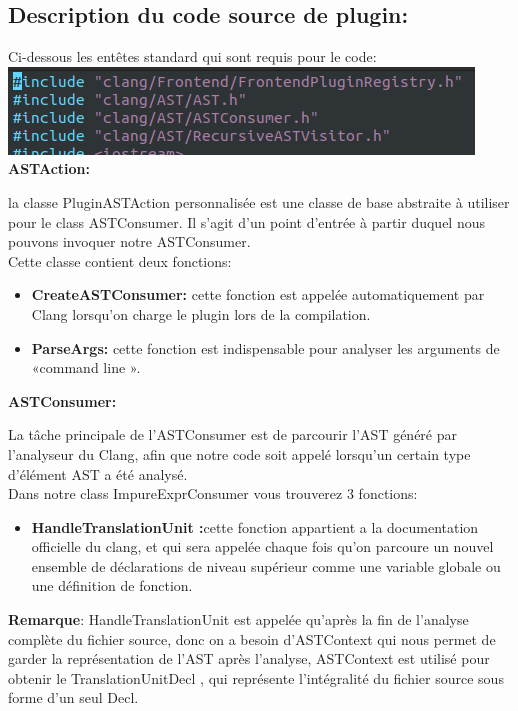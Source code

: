 \documentclass[12pt,titlepage]{article}
\begin{document}
\subsection{Description du code source de plugin:} 

Ci-dessous les entêtes standard qui sont requis pour le code: \\
\includegraphics[scale=0.6]{Bibliotheques.png}
\\
\textbf{ASTAction:}

la classe PluginASTAction personnalisée est une classe de base abstraite à utiliser pour  le class ASTConsumer. Il s’agit d’un point d'entrée à partir duquel nous pouvons invoquer notre ASTConsumer.\\
Cette classe contient deux fonctions:

\begin{itemize}
    \item \textbf{CreateASTConsumer:} cette fonction est appelée automatiquement par Clang  lorsqu'on charge le plugin lors de la compilation.
	\item \textbf{ ParseArgs:} cette fonction est indispensable pour analyser les arguments de «command line ».
\end{itemize}

\textbf{ASTConsumer:} 

La tâche principale de l’ASTConsumer est de parcourir  l'AST généré par l'analyseur du Clang, afin que notre code soit appelé lorsqu'un certain type d'élément AST a été analysé.\\
Dans notre class ImpureExprConsumer vous trouverez 3 fonctions:

\begin{itemize}
    \item \textbf{HandleTranslationUnit :}cette fonction appartient a la documentation officielle du clang, et qui sera appelée chaque fois qu’on parcoure un nouvel ensemble de déclarations de niveau supérieur comme une variable globale ou une  définition de fonction.
\end{itemize}

\textbf{Remarque}: HandleTranslationUnit est appelée qu'après la fin de l’analyse complète du fichier source, donc on a besoin d’ASTContext qui nous permet de garder la représentation de l’AST après l’analyse, ASTContext  est utilisé pour obtenir le TranslationUnitDecl , qui représente l'intégralité du fichier source sous forme d’un seul Decl. \\
\end{document}
